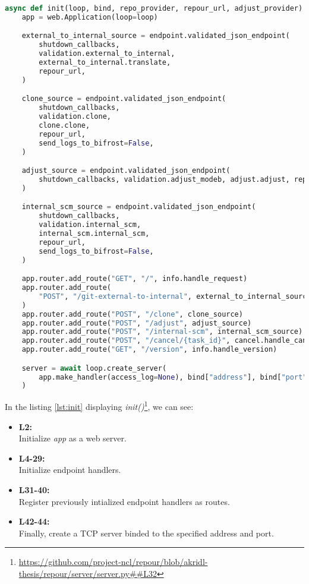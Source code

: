 \documentclass[../main.tex]{subfiles}
\begin{document}
\begin{lstlisting}[language=Python, caption=Server intialization: \textit{init} method, label={lst:init}]
async def init(loop, bind, repo_provider, repour_url, adjust_provider):
    app = web.Application(loop=loop)

    external_to_internal_source = endpoint.validated_json_endpoint(
        shutdown_callbacks,
        validation.external_to_internal,
        external_to_internal.translate,
        repour_url,
    )

    clone_source = endpoint.validated_json_endpoint(
        shutdown_callbacks,
        validation.clone,
        clone.clone,
        repour_url,
        send_logs_to_bifrost=False,
    )

    adjust_source = endpoint.validated_json_endpoint(
        shutdown_callbacks, validation.adjust_modeb, adjust.adjust, repour_url
    )

    internal_scm_source = endpoint.validated_json_endpoint(
        shutdown_callbacks,
        validation.internal_scm,
        internal_scm.internal_scm,
        repour_url,
        send_logs_to_bifrost=False,
    )

    app.router.add_route("GET", "/", info.handle_request)
    app.router.add_route(
        "POST", "/git-external-to-internal", external_to_internal_source
    )
    app.router.add_route("POST", "/clone", clone_source)
    app.router.add_route("POST", "/adjust", adjust_source)
    app.router.add_route("POST", "/internal-scm", internal_scm_source)
    app.router.add_route("POST", "/cancel/{task_id}", cancel.handle_cancel)
    app.router.add_route("GET", "/version", info.handle_version)

    server = await loop.create_server(
        app.make_handler(access_log=None), bind["address"], bind["port"]
    )
\end{lstlisting}


In the listing \ref{lst:init} displaying \textit{init()}\footnote{\url{https://github.com/project-ncl/repour/blob/akridl-thesis/repour/server/server.py##L32}}, we can see:
\begin{itemize}
    \item \textbf{L2:}\\
    Initialize \textit{app} as a web server.

    \item \textbf{L4-29:}\\
    Initialize endpoint handlers.

    \item \textbf{L31-40:}\\
    Register previously intialized endpoint handlers as routes.

    \item \textbf{L42-44:}\\
    Finally, create a TCP server binded to the specified address and port.

\end{itemize}
\end{document}

